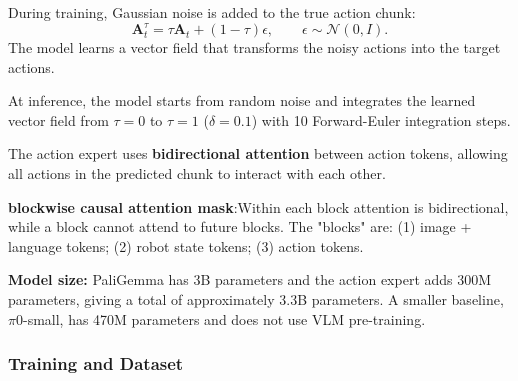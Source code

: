 \begin{dashlist}
During training, Gaussian noise is added to the true action chunk:
\[
    \mathbf{A}_t^\tau = \tau \mathbf{A}_t + (1-\tau)\epsilon,
    \qquad \epsilon\sim\mathcal{N}(0,I).
\]
The model learns a vector field that transforms the noisy actions into the target actions.

\item At inference, the model starts from random noise and integrates the learned vector field from $\tau=0$ to $\tau=1$ ($\delta=0.1$) with 10 Forward-Euler integration steps.

\item The action expert uses \textbf{bidirectional attention} between action tokens, allowing all actions in the predicted chunk to interact with each other.

\item \textbf{blockwise causal attention mask}:Within each block attention is bidirectional, while a block cannot attend to future blocks. The "blocks" are: (1) image + language tokens; (2) robot state tokens; (3) action tokens.

\item \textbf{Model size:} PaliGemma has 3B parameters and the action expert adds 300M parameters, giving a total of approximately 3.3B parameters. A smaller baseline, $\pi0$-small, has 470M parameters and does not use VLM pre-training.

\end{dashlist}

\subsubsection{Training and Dataset}


